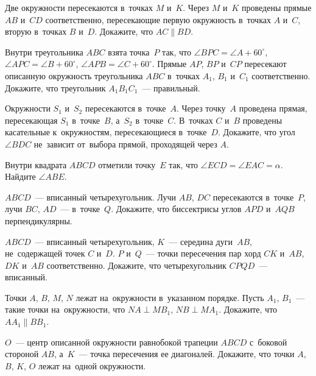 \begin{problems}

\item
Две окружности пересекаются в~точках $M$ и~$K$.
Через $M$ и~$K$ проведены прямые $AB$ и~$CD$ соответственно, пересекающие
первую окружность в~точках $A$ и~$C$, вторую в~точках $B$ и~$D$.
Докажите, что $AC \parallel BD$.

\item
Внутри треугольника $ABC$ взята точка~$P$ так, что
$\angle BPC = \angle A + 60^{\circ}$,
$\angle APC = \angle B + 60^{\circ}$,
$\angle APB = \angle C + 60^{\circ}$.
Прямые $AP$, $BP$ и~$CP$ пересекают описанную окружность треугольника $ABC$
в~точках $A_1$, $B_1$ и~$C_1$ соответственно.
Докажите, что треугольник $A_1 B_1 C_1$~--- правильный.

\item
Окружности $S_1$ и~$S_2$ пересекаются в~точке~$A$.
Через точку~$A$ проведена прямая, пересекающая $S_1$ в~точке~$B$, а~$S_2$
в~точке~$C$.
В~точках $C$ и~$B$ проведены касательные к~окружностям, пересекающиеся
в~точке~$D$.
Докажите, что угол $\angle BDC$ не~зависит от~выбора прямой, проходящей
через $A$.

\item
Внутри квадрата $ABCD$ отметили точку~$E$ так, что
$\angle ECD = \angle EAC = \alpha$.
Найдите $\angle ABE$.

\item
$ABCD$~--- вписанный четырехугольник.
Лучи $AB$, $DC$ пересекаются в~точке~$P$, лучи $BC$, $AD$~--- в~точке~$Q$.
Докажите, что биссектрисы углов $APD$ и~$AQB$ перпендикулярны.

\item
$ABCD$~--- вписанный четырехугольник, $K$~--- середина дуги~$AB$,
не~содержащей точек $C$ и~$D$.
$P$ и~$Q$~--- точки пересечения пар хорд $CK$ и~$AB$, $DK$ и~$AB$
соответственно.
Докажите, что четырехугольник $CPQD$~--- вписанный.

\item
Точки $A$, $B$, $M$, $N$ лежат на~окружности в~указанном порядке.
Пусть $A_1$, $B_1$~--- такие точки на~окружности, что
$N A \perp M B_1$, $N B \perp M A_1$.
Докажите, что $A A_1 \parallel B B_1$.

\item
$O$~--- центр описанной окружности равнобокой трапеции $ABCD$ с~боковой
стороной $AB$, а~$K$~--- точка пересечения ее диагоналей.
Докажите, что точки $A$, $B$, $K$, $O$ лежат на~одной окружности.

\end{problems}

